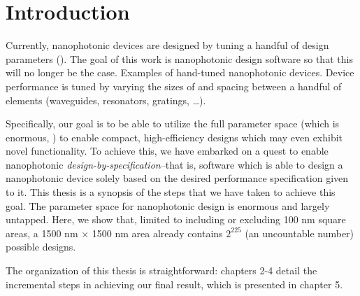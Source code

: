 \chapter{Introduction}
Currently, nanophotonic devices are designed by tuning
    a handful of design parameters ().
The goal of this work is nanophotonic design software
    so that this will no longer be the case.
    {Examples of hand-tuned nanophotonic devices.
    Device performance is tuned by varying the sizes of and spacing between
    a handful of elements (waveguides, resonators, gratings, \ldots).}

Specifically, our goal is to be able to utilize the full parameter space
    (which is enormous, )
    to enable compact, high-efficiency designs
    which may even exhibit novel functionality.
To achieve this, we have embarked on a quest 
    to enable nanophotonic \emph{design-by-specification}--that is,
    software which is able to design a nanophotonic device
    solely based on the desired performance specification given to it.
This thesis is a synopsis of the steps that we have taken to achieve this goal.
    {The parameter space for nanophotonic design is enormous and largely untapped.
    Here, we show that, 
        limited to including or excluding 100 nm square areas,
        a 1500 nm $\times$ 1500 nm area already contains $2^{225}$ 
        (an uncountable number) possible designs.}

The organization of this thesis is straightforward: 
    chapters 2-4 detail the incremental steps in achieving
    our final result, which is presented in chapter 5.
